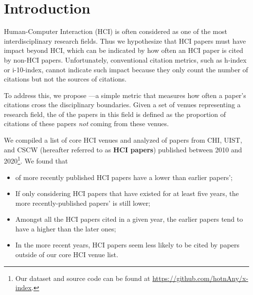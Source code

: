 \section{Introduction}

Human-Computer Interaction (HCI) is often considered as one of the most interdisciplinary research fields.
% 
Thus we hypothesize that HCI papers must have impact beyond HCI, which can be indicated by how often an HCI paper is cited by non-HCI papers.
% 
Unfortunately, conventional citation metrics, such as h-index or i-10-index, cannot indicate such impact because they only count the number of citations but not the sources of citations.

To address this, we propose \xin---a simple metric that measures how often a paper's citations cross the disciplinary boundaries.
Given a set of venues representing a research field, the \xin of the papers in this field is defined as the proportion of citations of these papers {\it not} coming from these venues.

We compiled a list of core HCI venues and analyzed \xin of papers from CHI, UIST, and CSCW (hereafter referred to as {\bf HCI papers}) published between 2010 and 2020\footnote{Our dataset and source code can be found at \url{https://github.com/hotnAny/x-index}.}.
We found that 
\begin{itemize} [leftmargin=0.25in]
    \item \xin of more recently published HCI papers have a lower \xin than earlier papers';
    \item If only considering HCI papers that have existed for at least five years, the more recently-published papers' \xin is still lower;
    \item Amongst all the HCI papers cited in a given year, the earlier papers tend to have a higher \xin than the later ones;
    \item In the more recent years, HCI papers seem less likely to be cited by papers outside of our core HCI venue list.
\end{itemize}




